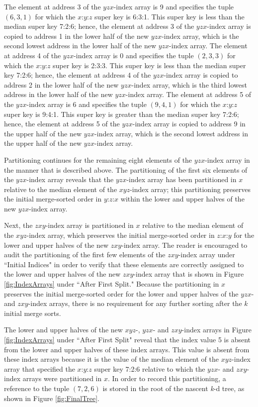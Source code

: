 \documentclass{sig-alternate}
\begin{document}
The element at address 3 of the $yzx$-index array is 9 and specifies the tuple $\left(6,3,1\right)$ for which the $x$:$y$:$z$ super key is 6:3:1.  This super key is less than the median super key 7:2:6; hence, the element at address 3 of the $yzx$-index array is copied to address 1 in the lower half of the new $yzx$-index array, which is the second lowest address in the lower half of the new $yzx$-index array.  The element at address 4 of the $yzx$-index array is 0 and specifies the tuple $\left(2,3,3\right)$ for which the $x$:$y$:$z$ super key is 2:3:3.  This super key is less than the median super key 7:2:6; hence, the element at address 4 of the $yzx$-index array is copied to address 2 in the lower half of the new $yzx$-index array, which is the third lowest address in the lower half of the new $yzx$-index array.  The element at address 5 of the $yzx$-index array is 6 and specifies the tuple $\left(9,4,1\right)$ for which the $x$:$y$:$z$ super key is 9:4:1.  This super key is greater than the median super key 7:2:6; hence, the element at address 5 of the $yzx$-index array is copied to address 9 in the upper half of the new $yzx$-index array, which is the second lowest address in the upper half of the new $yzx$-index array.

Partitioning continues for the remaining eight elements of the $yzx$-index array in the manner that is described above.  The partitioning of the first six elements of the $yzx$-index array reveals that the $yzx$-index array has been partitioned in $x$ relative to the median element of the $xyz$-index array; this partitioning preserves the initial merge-sorted order in $y$:$z$:$x$ within the lower and upper halves of the new $yzx$-index array.

Next, the $zxy$-index array is partitioned in $x$ relative to the median element of the $xyz$-index array, which preserves the initial merge-sorted order in $z$:$x$:$y$ for the lower and upper halves of the new $zxy$-index array.  The reader is encouraged to audit the partitioning of the first few elements of the $zxy$-index array under ``Initial Indices" in order to verify that these elements are correctly assigned to the lower and upper halves of the new $zxy$-index array that is shown in Figure \ref{fig:IndexArrays} under ``After First Split."  Because the partitioning in $x$ preserves the initial merge-sorted order for the lower and upper halves of the $yzx$- and $zxy$-index arrays, there is no requirement for any further sorting after the $k$ initial merge sorts.

The lower and upper halves of the new $xyz$-, $yzx$- and $zxy$-index arrays in Figure \ref{fig:IndexArrays} under ``After First Split" reveal that the index value 5 is absent from the lower and upper halves of these index arrays.  This value is absent from these index arrays because it is the value of the median element of the $xyz$-index array that specified the $x$:$y$:$z$ super key 7:2:6 relative to which the $yzx$- and $zxy$-index arrays were partitioned in $x$.  In order to record this partitioning, a reference to the tuple $\left(7,2,6\right)$ is stored in the root of the nascent \emph{k}-d tree, as shown in Figure \ref{fig:FinalTree}.
\end{document}

